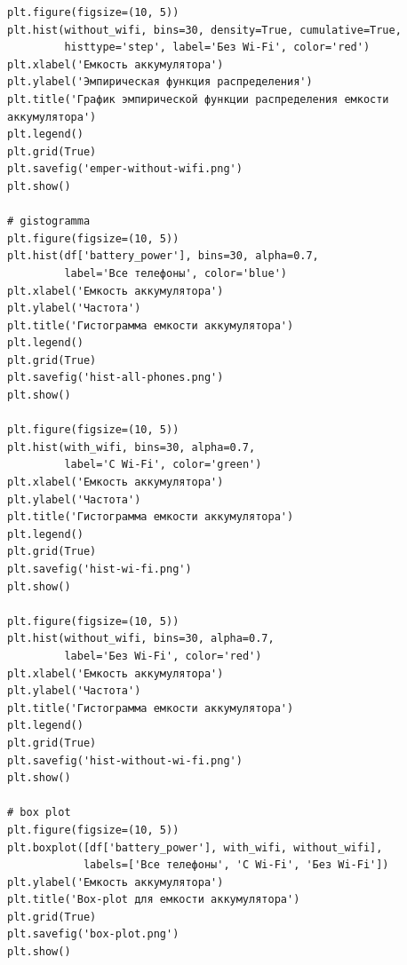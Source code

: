 \documentclass{article}
\begin{document}
\begin{verbatim}
plt.figure(figsize=(10, 5))
plt.hist(without_wifi, bins=30, density=True, cumulative=True,
         histtype='step', label='Без Wi-Fi', color='red')
plt.xlabel('Емкость аккумулятора')
plt.ylabel('Эмпирическая функция распределения')
plt.title('График эмпирической функции распределения емкости аккумулятора')
plt.legend()
plt.grid(True)
plt.savefig('emper-without-wifi.png')
plt.show()

# gistogramma
plt.figure(figsize=(10, 5))
plt.hist(df['battery_power'], bins=30, alpha=0.7,
         label='Все телефоны', color='blue')
plt.xlabel('Емкость аккумулятора')
plt.ylabel('Частота')
plt.title('Гистограмма емкости аккумулятора')
plt.legend()
plt.grid(True)
plt.savefig('hist-all-phones.png')
plt.show()

plt.figure(figsize=(10, 5))
plt.hist(with_wifi, bins=30, alpha=0.7,
         label='С Wi-Fi', color='green')
plt.xlabel('Емкость аккумулятора')
plt.ylabel('Частота')
plt.title('Гистограмма емкости аккумулятора')
plt.legend()
plt.grid(True)
plt.savefig('hist-wi-fi.png')
plt.show()

plt.figure(figsize=(10, 5))
plt.hist(without_wifi, bins=30, alpha=0.7,
         label='Без Wi-Fi', color='red')
plt.xlabel('Емкость аккумулятора')
plt.ylabel('Частота')
plt.title('Гистограмма емкости аккумулятора')
plt.legend()
plt.grid(True)
plt.savefig('hist-without-wi-fi.png')
plt.show()

# box plot
plt.figure(figsize=(10, 5))
plt.boxplot([df['battery_power'], with_wifi, without_wifi],
            labels=['Все телефоны', 'С Wi-Fi', 'Без Wi-Fi'])
plt.ylabel('Емкость аккумулятора')
plt.title('Box-plot для емкости аккумулятора')
plt.grid(True)
plt.savefig('box-plot.png')
plt.show()

\end{verbatim}
\end{document}

